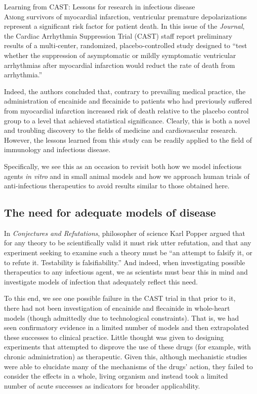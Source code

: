 \documentclass[11pt,final,twocolumn,twoside] {article}
\begin{document}
{\Large \noindent Learning from CAST: Lessons for research in infectious disease}\\

\noindent \lettrine[nindent=0em,lines=2]{A}mong survivors of myocardial infarction, ventricular premature depolarizations represent a significant risk factor for patient death. In this issue of the \textit{Journal}, the Cardiac Arrhythmia Suppression Trial (CAST) staff report preliminary results of a multi-center, randomized, placebo-controlled study designed to ``test whether the suppression of asymptomatic or mildly symptomatic ventricular arrhythmias after myocardial infarction would reduct the rate of death from arrhythmia.''\cite{CAST}

Indeed, the authors concluded that, contrary to prevailing medical practice, the administration of encainide and flecainide to patients who had previously suffered from myocardial infarction increased risk of death relative to the placebo control group to a level that achieved statistical significance. Clearly, this is both a novel and troubling discovery to the fields of medicine and cardiovascular research. However, the lessons learned from this study can be readily applied to the field of immunology and infectious disease.

Specifically, we see this as an occasion to revisit both how we model infectious agents {\itshape in vitro} and in small animal models and how we approach human trials of anti-infectious therapeutics to avoid results similar to those obtained here.

\subsection*{The need for adequate models of disease}

In {\itshape Conjectures and Refutations}, philosopher of science Karl Popper argued that for any theory to be scientifically valid it must risk utter refutation, and that any experiment seeking to examine such a theory must be ``an attempt to falsify it, or to refute it. Testability is falsifiability.''\cite{Popper} And indeed, when investigating possible therapeutics to any infectious agent, we as scientists must bear this in mind and investigate models of infection that adequately reflect this need.

To this end, we see one possible failure in the CAST trial in that prior to it, there had not been investigation of encainide and flecainide in whole-heart models (though admittedly due to technological constraints). That is, we had seen confirmatory evidence in a limited number of models and then extrapolated these successes to clinical practice. Little thought was given to designing experiments that attempted to disprove the use of these drugs (for example, with chronic administration) as therapeutic. Given this, although mechanistic studies were able to elucidate many of the mechanisms of the drugs' action, they failed to consider the effects in a whole, living organism and instead took a limited number of acute successes as indicators for broader applicability.\cite{Soyka}
\end{document}
